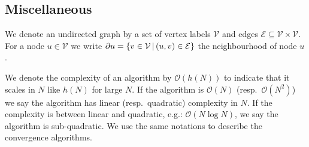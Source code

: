 \subsection*{Miscellaneous}
We denote an undirected graph by a set of vertex labels $\mathcal V$ and edges $\mathcal E\subseteq \mathcal V\times\mathcal V$. For a node $u\in\mathcal V$ we write $\partial u = \{v \in\mathcal V \,|\, (u,v)\in \mathcal E\}$ the neighbourhood of node $u$.

We denote the complexity of an algorithm by $\mathcal O(h(N))$ to indicate that it scales in $N$ like $h(N)$ for large $N$. If the algorithm is $\mathcal O(N)$ (resp.\ $\mathcal O(N^{2})$) we say the algorithm has linear (resp.\ quadratic) complexity in $N$. If the complexity is between linear and quadratic, e.g.: $\mathcal O(N\log N)$, we say the algorithm is sub-quadratic. We use the same notations to describe the convergence algorithms.



